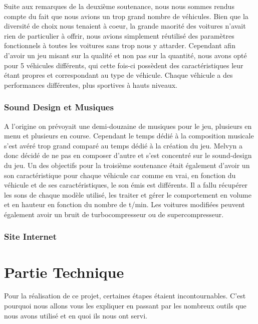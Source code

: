 \documentclass[a4paper,12pt]{article}
\begin{document}
            Suite aux remarques de la deuxième soutenance, nous nous sommes rendus compte du fait que nous avions un trop grand nombre de véhicules. Bien que la diversité de choix nous tenaient à coeur, la grande maorité des voitures n'avait rien de particulier à offrir, nous avions simplement réutilisé des paramètres fonctionnels à toutes les voitures sans trop nous y attarder. Cependant afin d'avoir un jeu misant sur la qualité et non pas sur la quantité, nous avons opté pour 5 véhicules différents, qui cette fois-ci possèdent des caractéristiques leur étant propres et correspondant au type de véhicule. Chaque véhicule a des performances différentes, plus sportives à hauts niveaux.
            
            \subsubsection{Sound Design et Musiques}
            
            A l'origine on prévoyait une demi-douzaine de musiques pour le jeu, plusieurs en menu et plusieurs en course. Cependant le temps dédié à la composition musicale s'est avéré trop grand comparé au temps dédié à la création du jeu. Melvyn a donc décidé de ne pas en composer d'autre et s'est concentré sur le sound-design du jeu. Un des objectifs pour la troisième soutenance était également d'avoir un son caractéristique pour chaque véhicule car comme en vrai, en fonction du véhicule et de ses caractéristiques, le son émis est différents. Il a fallu récupérer les sons de chaque modèle utilisé, les traiter et gérer le comportement en volume et en hauteur en fonction du nombre de t/min. Les voitures modifiées peuvent également avoir un bruit de turbocompresseur ou de supercompresseur.
            
            \subsubsection{Site Internet}
            \lipsum[33]
            
            

    \section{Partie Technique}
    Pour la réalisation de ce projet, certaines étapes étaient incontournables. C'est pourquoi nous allons vous les expliquer en passant par les nombreux outils que nous avons utilisé et en quoi ils nous ont servi.
\end{document}
